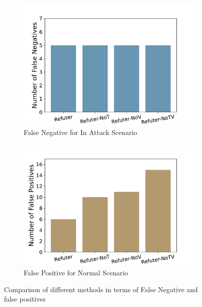 \begin{figure}[h]
    \centering
    \begin{subfigure}[b]{0.23\textwidth}
        \includegraphics[width=\textwidth]{figs/FN.pdf}
        \caption{False Negative for In Attack Scenario}
        \label{fig:missed_attacks}
    \end{subfigure}
    \hfill
    \begin{subfigure}[b]{0.23\textwidth}
        \includegraphics[width=\textwidth]{figs/FP.pdf}
        \caption{False Positive for Normal Scenario}
        \label{fig:false_positives}
    \end{subfigure}
    \caption{Comparison of different methods in terms of False Negative and false positives}
    \label{fig:comparison}
\end{figure}
